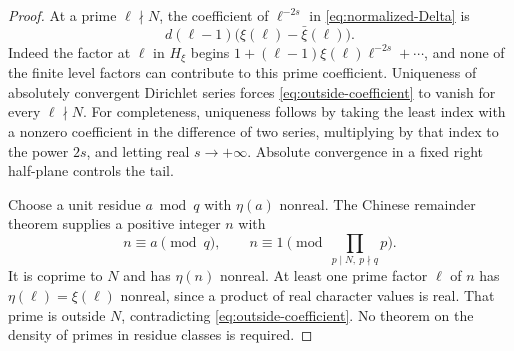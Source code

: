 \begin{proof}
At a prime \(\ell\nmid N\), the coefficient of \(\ell^{-2s}\)
in \eqref{eq:normalized-Delta} is
\begin{equation}\label{eq:outside-coefficient}
 d(\ell-1)\bigl(\xi(\ell)-\bar\xi(\ell)\bigr).
\end{equation}
Indeed the factor at \(\ell\) in \(H_\xi\) begins
\(1+(\ell-1)\xi(\ell)\ell^{-2s}+\cdots\), and none of the finite
level factors can contribute to this prime coefficient.
Uniqueness of absolutely convergent Dirichlet series forces
\eqref{eq:outside-coefficient} to vanish for every \(\ell\nmid N\).
For completeness, uniqueness follows by taking the least index with
a nonzero coefficient in the difference of two series, multiplying
by that index to the power \(2s\), and letting real \(s\to+\infty\).
Absolute convergence in a fixed right half-plane controls the tail.

Choose a unit residue \(a\bmod q\) with \(\eta(a)\) nonreal.
The Chinese remainder theorem supplies a positive integer \(n\) with
\[
 n\equiv a\pmod q,\qquad
 n\equiv1\pmod{\prod_{p\mid N,\ p\nmid q}p}.
\]
It is coprime to \(N\) and has \(\eta(n)\) nonreal. At least one
prime factor \(\ell\) of \(n\) has \(\eta(\ell)=\xi(\ell)\)
nonreal, since a product of real character values is real.
That prime is outside \(N\), contradicting
\eqref{eq:outside-coefficient}. No theorem on the density of primes
in residue classes is required.
\end{proof}
